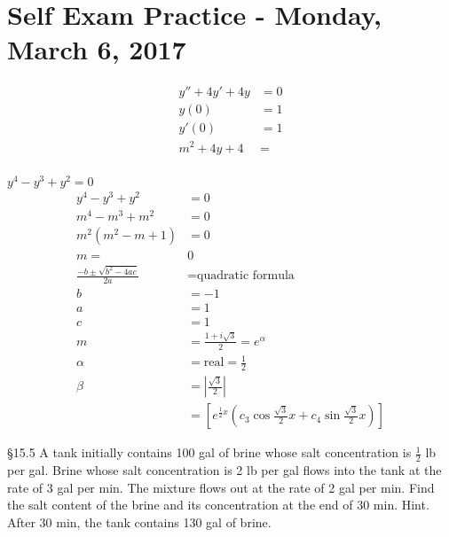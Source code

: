 \chapter{Self Exam Practice - Monday, March 6, 2017}
\begin{prob}
\begin{align*}
    y''+4y'+4y&=0\\
    y(0)&=1\\
    y'(0)&=1\\
    m^2+4y+4&=\\
\end{align*}
\end{prob}
\begin{prob}
$y^4-y^3+y^2=0$
\begin{align*}
    y^4-y^3+y^2&=0\\
    m^4-m^3+m^2&=0\\
    m^2(m^2-m+1)&=0\\
    m=&0\\
    \frac{-b\pm \sqrt{b^2-4ac}}{2a}&=\text{quadratic formula}\\
    b&=-1\\
    a&=1\\
    c&=1\\
    m&=\frac{1+i\sqrt{3}}{2}=e^{\alpha}\\
    \alpha&=\text{real}=\frac{1}{2}\\
    \beta &= \left| \frac{\sqrt{3}}{2} \right| \\
    &= \left[ e^{\frac{1}{2}x} \left( c_3 \cos \frac{\sqrt{3}}{2}x+c_4 \sin \frac{\sqrt{3}}{2}x \right) \right]
\end{align*}
\end{prob}
\begin{prob}
\S 15.5 A tank initially contains 100 gal of brine whose salt concentration is $\frac{1}{2}$ lb per gal. Brine whose salt concentration is 2 lb per gal flows into the tank at the rate of 3 gal per min. The mixture flows out at the rate of 2 gal per min. Find the salt content of the brine and its concentration at the end of 30 min. Hint. After 30 min, the tank contains 130 gal of brine.
\end{prob}